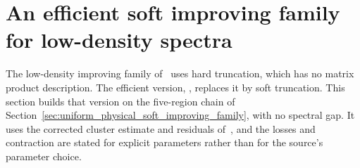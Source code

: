 \section{An efficient soft improving family for low-density spectra}
\label{sec:efficient_soft_low_density_family}

The low-density improving family of~\cite[lines 1027--1041]{Arad2016RigorousRG}
uses hard truncation, which has no matrix product description. The efficient
version, \cite[lines 1424--1437]{Arad2016RigorousRG}, replaces it by soft
truncation. This section builds that version on the five-region chain of
Section~\ref{sec:uniform_physical_soft_improving_family}, with no spectral gap.
It uses the corrected cluster estimate and residuals
of~\cite{gap:alvv16_cluster_approximation,gap:alvv16_soft_regional_residuals},
and the losses and contraction are stated for explicit parameters rather
than for the source's parameter choice.

